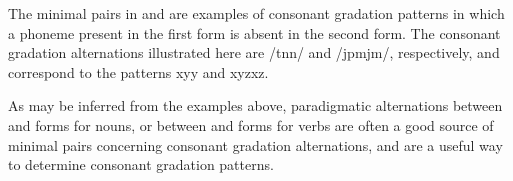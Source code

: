 The minimal pairs in  and  are examples of consonant gradation patterns in which a phoneme present in the first form is absent in the second form. The consonant gradation alternations illustrated here are \mbox{/tn\Div n/} and \mbox{/jpm\Div jm/}, respectively, and correspond to the patterns \mbox{xy\Div y} and \mbox{xyz\Div xz}. %
\ea\label{CgradEx2a}%
\z
\ea\label{CgradEx2b}%
\z

As may be inferred from the examples above, paradigmatic alternations between \mbox{} and \mbox{} forms for nouns, or between  and  forms for verbs are often a good source of minimal pairs concerning consonant gradation alternations, and are a useful way to determine consonant gradation patterns. 


